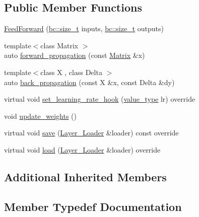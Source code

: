 \subsection*{Public Member Functions}
\begin{DoxyCompactItemize}
\item 
\hyperlink{structbc_1_1nn_1_1FeedForward_a98c53bf9790896a468efff3e8c4ac651}{Feed\+Forward} (\hyperlink{namespacebc_aaf8e3fbf99b04b1b57c4f80c6f55d3c5}{bc\+::size\+\_\+t} inputs, \hyperlink{namespacebc_aaf8e3fbf99b04b1b57c4f80c6f55d3c5}{bc\+::size\+\_\+t} outputs)
\item 
{\footnotesize template$<$class Matrix $>$ }\\auto \hyperlink{structbc_1_1nn_1_1FeedForward_a8606a0a356a01693127e34ab3483b5d1}{forward\+\_\+propagation} (const \hyperlink{namespacebc_a92dd1e243183b382432a5fac3ed8b89f}{Matrix} \&x)
\item 
{\footnotesize template$<$class X , class Delta $>$ }\\auto \hyperlink{structbc_1_1nn_1_1FeedForward_a3f712a67e12f12634ecd6ff40d7d0727}{back\+\_\+propagation} (const X \&x, const Delta \&dy)
\item 
virtual void \hyperlink{structbc_1_1nn_1_1FeedForward_a9a3f78006d1796787166bd1bc278b13f}{set\+\_\+learning\+\_\+rate\+\_\+hook} (\hyperlink{structbc_1_1nn_1_1FeedForward_ac5c2aca3fbe5dc0274874f302ad027fd}{value\+\_\+type} lr) override
\item 
void \hyperlink{structbc_1_1nn_1_1FeedForward_a2583b7f6eb69867ba439e63524ed7dfa}{update\+\_\+weights} ()
\item 
virtual void \hyperlink{structbc_1_1nn_1_1FeedForward_afd962933712eacd56880bbba0fb5948b}{save} (\hyperlink{structbc_1_1nn_1_1Layer__Loader}{Layer\+\_\+\+Loader} \&loader) const override
\item 
virtual void \hyperlink{structbc_1_1nn_1_1FeedForward_a8fccd9e87dda10e01e74732ad8c71f3d}{load} (\hyperlink{structbc_1_1nn_1_1Layer__Loader}{Layer\+\_\+\+Loader} \&loader) override
\end{DoxyCompactItemize}
\subsection*{Additional Inherited Members}


\subsection{Member Typedef Documentation}
\mbox{\label{structbc_1_1nn_1_1FeedForward_abacb25e939f5f9ac89fb49c88dd13043}} 
